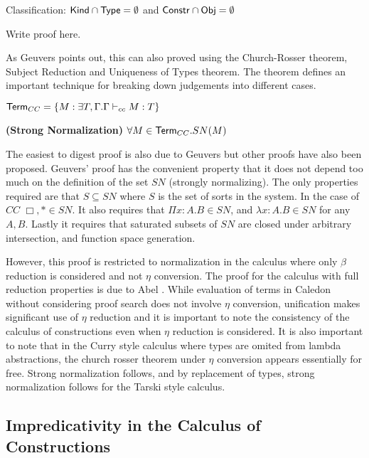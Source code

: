 \begin{theorem}
Classification:
$\mathsf{Kind}\cap \mathsf{Type} = \emptyset$ 
and
$\mathsf{Constr}\cap \mathsf{Obj} = \emptyset$ 
\end{theorem}

Write proof here.

As Geuvers points out, this can also proved using the Church-Rosser theorem, 
Subject Reduction and Uniqueness of Types theorem.  
The theorem defines an important technique for breaking down judgements into
different cases.

\begin{definition}
$ \mathsf{Term}_{CC}  = \{ M : \exists T,\Gamma . \Gamma \vdash_{cc} M : T \}$
\end{definition}

\begin{theorem}
\textbf{(Strong Normalization)} $\forall M \in \mathsf{Term}_{CC}. SN(M)$
\end{theorem}

The easiest to digest proof is also due to Geuvers \citep{Geuvers94ashort} 
but other proofs have also been proposed.  Geuvers' proof has the convenient
property that it does not depend too much on the definition of the set $SN$ 
(strongly normalizing). The only properties required are that $S \subseteq SN$ 
where $S$ is the set of sorts in the system. In the case of $CC$ $\Box,* \in SN$.
It also requires that $\Pi x : A . B \in SN$, and $\lambda x : A . B \in SN$ 
for any $A,B$.  Lastly it requires that saturated subsets of $SN$ are closed under
arbitrary intersection, and function space generation.

However, this proof is restricted to normalization in the calculus where only $\beta$ reduction 
is considered and not $\eta$ conversion.  The proof for the calculus with full reduction properties is due
to Abel \citep{abel2010towards}.  While evaluation of terms in Caledon without considering proof search does
not involve $\eta$ conversion, unification makes significant use of $\eta$ reduction and it is important to note
the consistency of the calculus of constructions even when $\eta$ reduction is considered.  
It is also important to note that in the Curry style calculus where types are omited from lambda abstractions, 
the church rosser theorem under $\eta$ conversion appears essentially for free\citep{miquel2001implicit}. Strong normalization 
follows, and by replacement of types, strong normalization follows for the Tarski style calculus.


\subsection{Impredicativity in the Calculus of Constructions}

